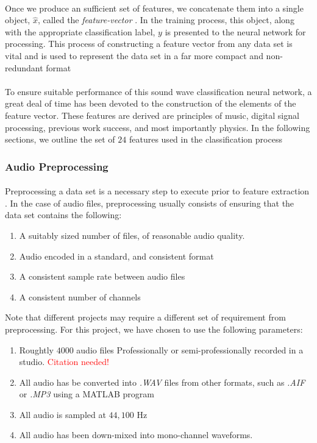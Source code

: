 \documentclass[12pt,letterpaper]{article}
\begin{document}
\paragraph*{}Once we produce an sufficient set of features, we concatenate them into a single object, $\hat{x}$, called the \textit{feature-vector} \cite{Goodfellow}. In the training process, this object, along with the appropriate classification label, $y$ is presented to the neural network for processing. This process of constructing a feature vector from any data set is vital and is used to represent the data set in a far more compact and non-redundant format \cite{Virtanen,Liu}

\paragraph*{}To ensure suitable performance of this sound wave classification neural network, a great deal of time has been devoted to the construction of the elements of the feature vector. These features are derived are principles of music, digital signal processing, previous work success, and most importantly physics. In the following sections, we outline the set of $24$ features used in the classification process

\subsubsection{Audio Preprocessing}

\paragraph*{}Preprocessing a data set is a necessary step to execute prior to feature extraction \cite{Geron2,James}. In the case of audio files, preprocessing usually consists of ensuring that the data set contains the following:
\begin{enumerate}
\item A suitably sized number of files, of reasonable audio quality.
\item Audio encoded in a standard, and consistent format
\item A consistent sample rate between audio files
\item A consistent number of channels
\end{enumerate}
Note that different projects may require a different set of requirement from preprocessing\cite{Virtanen}. For this project, we have chosen to use the following parameters:
\begin{enumerate}
\item Roughtly $4000$ audio files Professionally or semi-professionally recorded in a studio. \textcolor{red}{Citation needed!}
\item All audio has be converted into \textit{.WAV} files from other formats, such as \textit{.AIF} or \textit{.MP3} using a MATLAB program
\item All audio is sampled at $44,100$ Hz
\item All audio has been down-mixed into mono-channel waveforms.
\end{enumerate}
\end{document}
